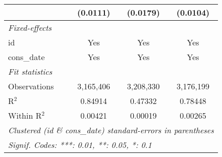 \begin{tabular}{lccc}
                                                             & (0.0111)        & (0.0179)       & (0.0104)\\
   \midrule \emph{Fixed-effects} &   &   &  \\
   id                                                        & Yes             & Yes            & Yes\\
   cons\_date                                               & Yes             & Yes            & Yes\\
   \midrule \emph{Fit statistics} &   &   &  \\
   Observations                                              & 3,165,406       & 3,208,330      & 3,176,199\\
   R$^2$                                                     & 0.84914         & 0.47332        & 0.78448\\
   Within R$^2$                                              & 0.00421         & 0.00019        & 0.00265\\
   \midrule\midrule\multicolumn{4}{l}{\emph{Clustered (id \& cons\_date) standard-errors in parentheses}}\\
   \multicolumn{4}{l}{\emph{Signif. Codes: ***: 0.01, **: 0.05, *: 0.1}}\\
\end{tabular}


